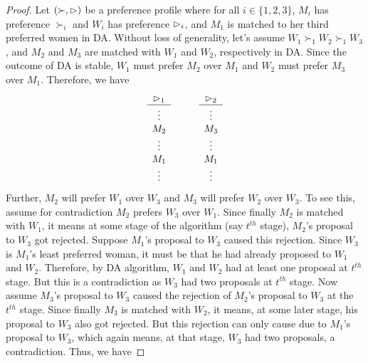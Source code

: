\begin{proof}
Let $(\succ,\vartriangleright)$ be a preference profile where for all $i\in \{1,2,3\}$, $M_i$ has preference $\succ_i$ and $W_i$ has preference $\vartriangleright_i$, and $M_1$ is matched to her third preferred women in DA. Without loss of generality, let's assume $W_1 \succ_1 W_2 \succ_1 W_3$, and $M_2$ and $M_3$ are matched with $W_1$ and $W_2$, respectively in DA. Since the outcome of DA is stable, $W_1$ must prefer $M_2$ over $M_1$ and $W_2$ must prefer $M_3$ over $M_1$. Therefore, we have \[  \begin{array}{c}
	   \rva_1 \\
	\hline
	\vdots \\
	M_2\\
        \vdots\\
        M_1\\
        \vdots
\end{array} 
\hspace{10mm}
%
\begin{array}{c}
	\rva_2 \\
	\hline
	\vdots \\
	M_3\\
        \vdots\\
        M_1\\
        \vdots
\end{array} 
\]
Further, $M_2$ will prefer $W_1$ over $W_3$ and $M_3$ will prefer $W_2$ over $W_3$. To see this, assume for contradiction  $M_2$ prefers $W_3$ over $W_1$. Since finally $M_2$ is matched with $W_1$, it means at some stage of the algorithm (say $t^{th}$ stage), $M_2$'s proposal to $W_3$ got rejected. Suppose $M_1$'s proposal to $W_3$ caused this rejection. Since $W_3$ is $M_1$'s least preferred woman, it must be that he had already proposed to $W_1$ and $W_2$. Therefore, by DA algorithm, $W_1$ and $W_2$ had at least one proposal at $t^{th}$ stage. But this is a contradiction as $W_3$ had two proposals at $t^{th}$ stage. Now assume $M_3$'s proposal to $W_3$ caused the rejection of $M_2$'s proposal to $W_3$ at the $t^{th}$ stage. Since finally $M_3$ is matched with $W_2$, it means, at some later stage, his proposal to $W_3$ also got rejected. But this rejection can only cause due to $M_1$'s proposal to $W_3$, which again means, at that stage, $W_3$ had two proposals, a contradiction. Thus, we have




\end{proof}
